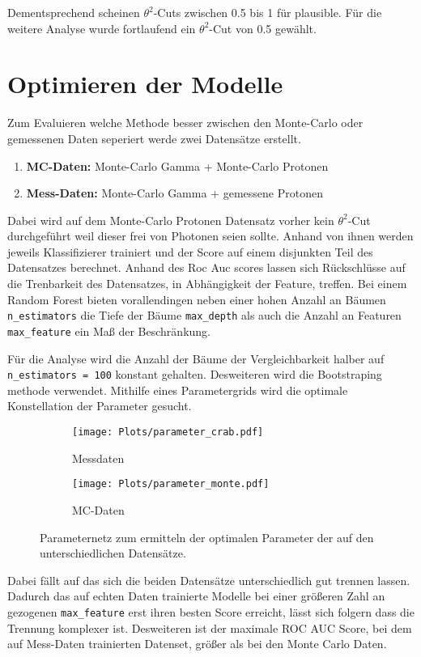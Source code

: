 Dementsprechend scheinen $\theta^{2}$-Cuts zwischen \num{0.5} bis \num{1} für plausible. Für die weitere Analyse wurde fortlaufend ein $\theta^{2}$-Cut von \num{0.5} gewählt. 
\section{Optimieren der Modelle}
Zum Evaluieren welche Methode besser zwischen den Monte-Carlo oder gemessenen Daten seperiert werde zwei Datensätze erstellt. 
\begin{enumerate}
  \item \textbf{MC-Daten:} Monte-Carlo Gamma + Monte-Carlo Protonen
  \item \textbf{Mess-Daten:} Monte-Carlo Gamma + gemessene Protonen 
\end{enumerate}
Dabei wird auf dem Monte-Carlo Protonen Datensatz vorher kein $\theta^{2}$-Cut durchgeführt weil dieser frei von Photonen seien sollte.
Anhand von ihnen werden jeweils Klassifizierer trainiert und der Score auf einem disjunkten Teil des Datensatzes berechnet. 
Anhand des Roc Auc scores lassen sich Rückschlüsse auf die Trenbarkeit des Datensatzes, in Abhängigkeit der Feature, treffen. 
Bei einem Random Forest bieten vorallendingen neben einer hohen Anzahl an Bäumen \texttt{n\_estimators} die Tiefe der Bäume \texttt{max\_depth} als auch die Anzahl an Featuren \texttt{max\_feature} ein Maß der Beschränkung.

Für die Analyse wird die Anzahl der Bäume der Vergleichbarkeit halber auf \texttt{n\_estimators = 100} konstant gehalten. 
Desweiteren wird die Bootstraping methode verwendet. 
Mithilfe eines Parametergrids wird die optimale Konstellation der Parameter gesucht. 
\begin{figure}
  \begin{subfigure}[b]{0.5\textwidth}
	\texttt{[image: Plots/parameter\_crab.pdf]}
	\caption{Messdaten}
	\label{fig:messGrid}
  \end{subfigure}
  \begin{subfigure}[b]{0.5\textwidth}
	\texttt{[image: Plots/parameter\_monte.pdf]}
	\caption{MC-Daten}
	\label{fig:mcGrid}
  \end{subfigure}
  \caption{Parameternetz zum ermitteln der optimalen Parameter der auf den unterschiedlichen Datensätze.}
\end{figure}

Dabei fällt auf das sich die beiden Datensätze unterschiedlich gut trennen lassen.
Dadurch das auf echten Daten trainierte Modelle bei einer größeren Zahl an gezogenen \texttt{max\_feature} erst ihren besten Score erreicht, lässt sich folgern dass die Trennung komplexer ist.
Desweiteren ist der maximale ROC AUC Score, bei dem auf Mess-Daten trainierten Datenset, größer als bei den Monte Carlo Daten. 

